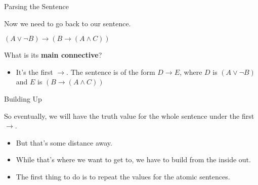 \documentclass[
  ignorenonframetext,
]{beamer}
\providecommand{\tightlist}{%
  \setlength{\itemsep}{0pt}\setlength{\parskip}{0pt}}
\renewcommand{\,}{\text{, }}
\renewenvironment*{quote}	
	{\list{}{\rightmargin   \leftmargin} \item } 	
	{\endlist }
\begin{document}
\begin{frame}{Parsing the Sentence}
\protect\hypertarget{parsing-the-sentence}{}

Now we need to go back to our sentence.

\begin{quote}
\((A \vee \neg B) \rightarrow (B \rightarrow (A \wedge C))\)
\end{quote}

What is its \textbf{main connective}? \pause \bigskip

\begin{itemize}
\tightlist
\item
  It's the first \(\rightarrow\). The sentence is of the form
  \(D \rightarrow E\), where \(D\) is \((A \vee \neg B)\) and \(E\) is
  \((B \rightarrow (A \wedge C))\)
\end{itemize}

\end{frame}

\begin{frame}{Building Up}
\protect\hypertarget{building-up}{}

So eventually, we will have the truth value for the whole sentence under
the first \(\rightarrow\).

\begin{itemize}
\tightlist
\item
  But that's some distance away.
\item
  While that's where we want to get to, we have to build from the inside
  out.
\item
  The first thing to do is to repeat the values for the atomic
  sentences.
\end{itemize}

\end{frame}
\end{document}
